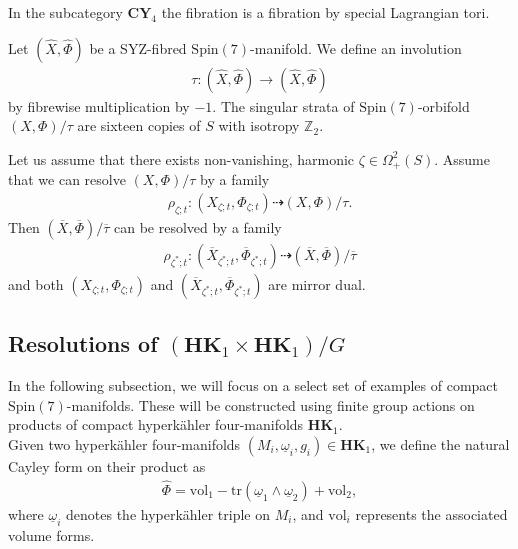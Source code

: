 \documentclass[psamsfonts]{amsart}
\theoremstyle{plain}
\theoremstyle{definition}{
\newtheorem{defi}{Definition}[section]
\newtheorem{ass}{Assumption}
\newtheorem*{nota}{Notation}}
\theoremstyle{remark}{
\newtheorem{rem}{Remark}
\newtheorem{ex}{Example}}
\theoremstyle{plain}{
\newtheorem{thm}{Theorem}[section]
\newtheorem{lem}{Lemma}[section]
\newtheorem{cor}{Corollary}[section]
\newtheorem{prop}{Proposition}[section]
\newtheorem{con}{Conjecture}[section]}
\newcommand{\m}[1]{{\mathrm{#1}}}
\newcommand{\cat}[1]{\textbf{#1}}
\begin{document}
\begin{rem}
    In the subcategory $\cat{CY}_4$ the fibration is a fibration by special Lagrangian tori. 
\end{rem}


Let $(\hat{X},\hat{\Phi})$ be a SYZ-fibred $\m{Spin}(7)$-manifold. We define an involution 
    \begin{align*}
        \tau\colon (\hat{X},\hat{\Phi})\rightarrow (\hat{X},\hat{\Phi})
    \end{align*}
by fibrewise multiplication by $-1$. The singular strata of $\m{Spin}(7)$-orbifold $(X,\Phi)/\tau$ are sixteen copies of $S$ with isotropy $\mathbb{Z}_2$.

\begin{con}
Let us assume that there exists non-vanishing, harmonic $\zeta\in \Omega^2_+(S)$. Assume that we can resolve $(X,\Phi)/\tau$ by a family 
    \begin{align*}
        \rho_{\zeta;t}\colon (X_{\zeta;t},\Phi_{\zeta;t})\dashrightarrow (X,\Phi)/\tau.
    \end{align*}
Then $(\overline{X},\overline{\Phi})/\overline{\tau}$ can be resolved by a family 
\begin{align*}
    \rho_{\zeta^*;t}\colon (\overline{X}_{\zeta^*;t},\overline{\Phi}_{\zeta^*;t})\dashrightarrow (\overline{X},\overline{\Phi})/\overline{\tau}
\end{align*}
and both $(X_{\zeta;t},\Phi_{\zeta;t})$ and $(\overline{X}_{\zeta^*;t},\overline{\Phi}_{\zeta^*;t})$ are mirror dual.
\end{con}




\subsection{Resolutions of $(\cat{HK}_1\times \cat{HK}_1)/G$}
\label{Resolutions of HK1timesHK1Gamma}

In the following subsection, we will focus on a select set of examples of compact $\m{Spin}(7)$-manifolds. These will be constructed using finite group actions on products of compact hyperkähler four-manifolds $\cat{HK}_1$.\\

Given two hyperkähler four-manifolds $(M_i,\underline{\omega}_i,g_i) \in \cat{HK}_1$, we define the natural Cayley form on their product as
\begin{align*}
    \hat{\Phi} = \m{vol}_1 - \m{tr}(\underline{\omega}_1 \wedge \underline{\omega}_2) + \m{vol}_2,
\end{align*}
where $\underline{\omega}_i$ denotes the hyperkähler triple on $M_i$, and $\m{vol}_i$ represents the associated volume forms.
\end{document}
